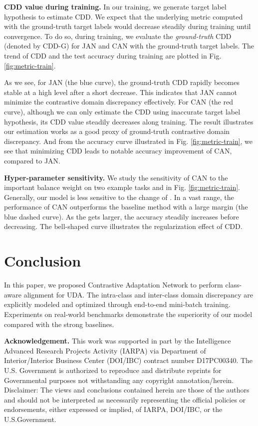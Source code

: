 \documentclass[10pt,twocolumn,letterpaper]{article}
\begin{document}
\textbf{CDD value during training.}
In our training, we generate target label hypothesis to estimate CDD.
We expect that the underlying metric computed with the ground-truth target labels 
would decrease steadily during training until convergence.
To do so, during training, we evaluate the \textit{ground-truth} CDD (denoted by CDD-G) for JAN and CAN with the ground-truth target labels. The trend of CDD and the test accuracy during training are plotted in Fig. \ref{fig:metric-train}. 




As we see, for JAN (the blue curve), the ground-truth CDD rapidly becomes stable at a high level
after a short decrease.
This indicates that JAN cannot minimize the contrastive domain discrepancy effectively. For CAN (the red curve), although we can only estimate the CDD using inaccurate target label hypothesis, 
its CDD value steadily decreases along training.
The result illustrates our estimation works as a good proxy of ground-truth contrastive domain discrepancy.
And from the accuracy curve illustrated in Fig. \ref{fig:metric-train}, 
we see that minimizing CDD leads to notable accuracy improvement of CAN,
compared to JAN.


\textbf{Hyper-parameter sensitivity.}
We study the sensitivity of CAN to the important balance weight  on two example tasks  and  in Fig. \ref{fig:metric-train}. 
Generally, our model is less sensitive to the change of . In a vast range, the performance of CAN outperforms the baseline method with a large margin (the blue dashed curve). As the  gets larger, the accuracy steadily increases before decreasing. The bell-shaped curve illustrates the regularization effect of CDD.  
\section{Conclusion}
In this paper, we proposed Contrastive Adaptation Network to perform class-aware alignment for 
UDA.
The intra-class and inter-class domain discrepancy are explicitly modeled and optimized through end-to-end mini-batch training. 
Experiments on real-world benchmarks 
demonstrate the superiority of our model compared with the strong baselines. 
%
 
\textbf{Acknowledgement.} \small{This work was supported in part by  the  Intelligence  Advanced Research Projects Activity (IARPA) via Department of  Interior/Interior  Business  Center  (DOI/IBC)  contract number  D17PC00340.  The  U.S.  Government  is  authorized to reproduce and distribute reprints for Governmental purposes  not withstanding  any  copyright  annotation/herein. Disclaimer: The views and conclusions contained herein are those of the authors and should not be interpreted as necessarily  representing  the  official  policies  or  endorsements, either expressed or implied, of IARPA, DOI/IBC, or the U.S.Government.}

{\small


}
\end{document}
